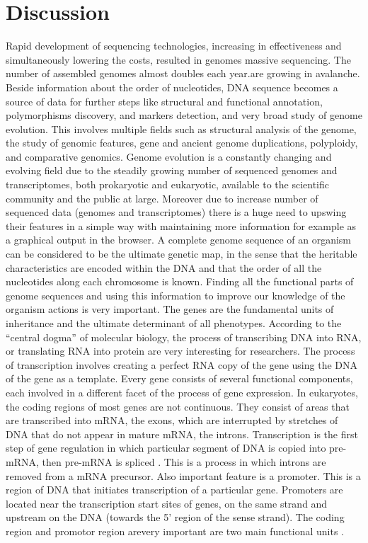 \documentclass[]{spie}
\begin{document}
\section{Discussion}

Rapid development of sequencing technologies, increasing in effectiveness and simultaneously lowering the costs, resulted in genomes massive sequencing. The number of assembled genomes almost doubles each year.are growing in avalanche.
Beside information about the order of nucleotides,
DNA sequence becomes a source of data for further steps like structural and functional annotation, polymorphisms discovery, and markers detection, and very broad study of genome evolution. This involves multiple fields such as structural analysis of the genome, the study of genomic features, gene and ancient genome duplications, polyploidy, and comparative genomics. Genome evolution is a constantly changing and evolving field due to the steadily growing number of sequenced genomes and transcriptomes, both prokaryotic and eukaryotic, available to the scientific community and the public at large.
Moreover due to increase  number of sequenced data  (genomes and transcriptomes) there is a huge need to upswing their features in a simple way with maintaining more information for example as a graphical output in the browser. A complete genome sequence of an organism can be considered to be the ultimate genetic map, in the sense that the heritable characteristics are encoded within the DNA and that the order of all the nucleotides along each chromosome is known. Finding all the functional parts of genome sequences and using this information to improve our knowledge of the  organism actions is very important. The genes are the fundamental units of inheritance and the ultimate determinant of all phenotypes. According to the “central dogma” of molecular biology, the process of transcribing DNA into RNA, or translating RNA into protein are very interesting for  researchers. The process of transcription involves creating a perfect RNA copy of the gene using the DNA of the gene as a template. Every gene consists of several functional components, each involved in a different facet of the process of gene expression. In eukaryotes, the coding regions of most genes are not continuous. They consist of areas that are transcribed into mRNA, the exons, which are interrupted by stretches of DNA that do not appear in mature mRNA, the introns. Transcription is the first step of gene regulation in which particular segment of DNA is copied into pre-mRNA, then pre-mRNA is spliced \cite{chen2009mechanisms}. This is a process in which introns are removed from a mRNA precursor. Also important feature is a promoter. This is a region of DNA that initiates transcription of a particular gene. Promoters are located near the transcription start sites of genes, on the same strand and upstream on the DNA (towards the 5' region of the sense strand). The coding region and promotor region arevery important are two main functional units \cite{pawelkowicz2016next}.
\end{document}
